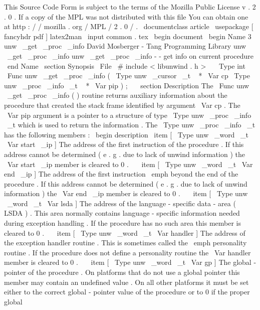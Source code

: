 %
This
Source
Code
Form
is
subject
to
the
terms
of
the
Mozilla
Public
%
License
v
.
2
.
0
.
If
a
copy
of
the
MPL
was
not
distributed
with
this
%
file
You
can
obtain
one
at
http
:
/
/
mozilla
.
org
/
MPL
/
2
.
0
/
.
\
documentclass
{
article
}
\
usepackage
[
fancyhdr
pdf
]
{
latex2man
}
\
input
{
common
.
tex
}
\
begin
{
document
}
\
begin
{
Name
}
{
3
}
{
unw
\
_get
\
_proc
\
_info
}
{
David
Mosberger
-
Tang
}
{
Programming
Library
}
{
unw
\
_get
\
_proc
\
_info
}
unw
\
_get
\
_proc
\
_info
-
-
get
info
on
current
procedure
\
end
{
Name
}
\
section
{
Synopsis
}
\
File
{
\
#
include
<
libunwind
.
h
>
}
\
\
\
Type
{
int
}
\
Func
{
unw
\
_get
\
_proc
\
_info
}
(
\
Type
{
unw
\
_cursor
\
_t
~
*
}
\
Var
{
cp
}
\
Type
{
unw
\
_proc
\
_info
\
_t
~
*
}
\
Var
{
pip
}
)
;
\
\
\
section
{
Description
}
The
\
Func
{
unw
\
_get
\
_proc
\
_info
}
(
)
routine
returns
auxiliary
information
about
the
procedure
that
created
the
stack
frame
identified
by
argument
\
Var
{
cp
}
.
The
\
Var
{
pip
}
argument
is
a
pointer
to
a
structure
of
type
\
Type
{
unw
\
_proc
\
_info
\
_t
}
which
is
used
to
return
the
information
.
The
\
Type
{
unw
\
_proc
\
_info
\
_t
}
has
the
following
members
:
\
begin
{
description
}
\
item
[
\
Type
{
unw
\
_word
\
_t
}
\
Var
{
start
\
_ip
}
]
The
address
of
the
first
instruction
of
the
procedure
.
If
this
address
cannot
be
determined
(
e
.
g
.
due
to
lack
of
unwind
information
)
the
\
Var
{
start
\
_ip
}
member
is
cleared
to
0
.
\
\
\
item
[
\
Type
{
unw
\
_word
\
_t
}
\
Var
{
end
\
_ip
}
]
The
address
of
the
first
instruction
\
emph
{
beyond
}
the
end
of
the
procedure
.
If
this
address
cannot
be
determined
(
e
.
g
.
due
to
lack
of
unwind
information
)
the
\
Var
{
end
\
_ip
}
member
is
cleared
to
0
.
\
\
\
item
[
\
Type
{
unw
\
_word
\
_t
}
\
Var
{
lsda
}
]
The
address
of
the
language
-
specific
data
-
area
(
LSDA
)
.
This
area
normally
contains
language
-
specific
information
needed
during
exception
handling
.
If
the
procedure
has
no
such
area
this
member
is
cleared
to
0
.
\
\
\
item
[
\
Type
{
unw
\
_word
\
_t
}
\
Var
{
handler
}
]
The
address
of
the
exception
handler
routine
.
This
is
sometimes
called
the
\
emph
{
personality
}
routine
.
If
the
procedure
does
not
define
a
personality
routine
the
\
Var
{
handler
}
member
is
cleared
to
0
.
\
\
\
item
[
\
Type
{
unw
\
_word
\
_t
}
\
Var
{
gp
}
]
The
global
-
pointer
of
the
procedure
.
On
platforms
that
do
not
use
a
global
pointer
this
member
may
contain
an
undefined
value
.
On
all
other
platforms
it
must
be
set
either
to
the
correct
global
-
pointer
value
of
the
procedure
or
to
0
if
the
proper
global

